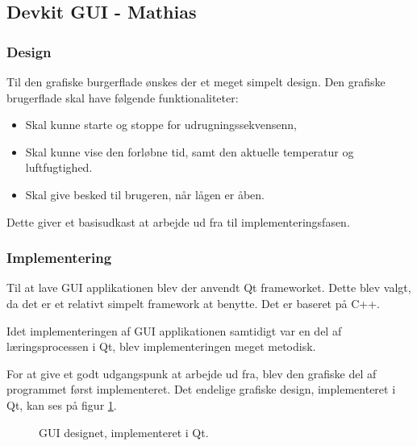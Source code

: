 \subsection{Devkit GUI - Mathias}

\subsubsection{Design}

Til den grafiske burgerflade ønskes der et meget simpelt design. Den grafiske brugerflade skal have følgende funktionaliteter:

\begin{itemize}
	\item Skal kunne starte og stoppe for udrugningssekvensenn, 
	\item Skal kunne vise den forløbne tid, samt den aktuelle temperatur og luftfugtighed.
	\item Skal give besked til brugeren, når lågen er åben.
\end{itemize}

Dette giver et basisudkast at arbejde ud fra til implementeringsfasen.

\subsubsection{Implementering}
Til at lave GUI applikationen blev der anvendt Qt frameworket. Dette blev valgt, da det er et relativt simpelt framework at benytte. Det er baseret på C++.

Idet implementeringen af GUI applikationen samtidigt var en del af læringsprocessen i Qt, blev implementeringen meget metodisk. 

For at give et godt udgangspunk at arbejde ud fra, blev den grafiske del af programmet først implementeret. Det endelige grafiske design, implementeret i Qt, kan ses på figur \ref{fig:GUI}.

\begin{figure}[H]
\centering
{}
\caption[Figur]{GUI designet, implementeret i Qt.}
\label{fig:GUI}
\end{figure}

